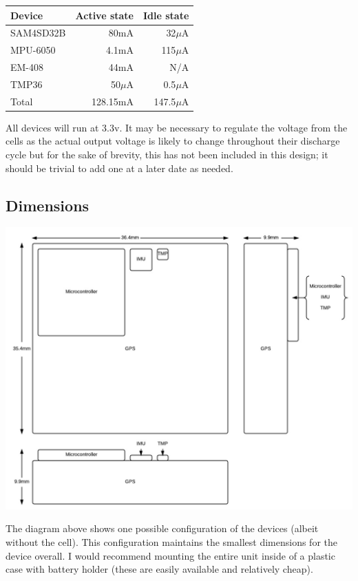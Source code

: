 \documentclass[a4paper, twoside]{article}
\begin{document}
\begin{tabular}{|l|r|r|}
	\hline
	\textbf{Device} & \textbf{Active state} & \textbf{Idle state} \\
	\hline
	\hline
	SAM4SD32B & 80mA & 32$\mu$A \\
	MPU-6050 & 4.1mA & 115$\mu$A \\
	EM-408 & 44mA & N/A \\
	TMP36 & 50$\mu$A & 0.5$\mu$A \\
	\hline
	\hline
	Total & 128.15mA & 147.5$\mu$A \\
	\hline
\end{tabular}
\vspace{20pt}

All devices will run at 3.3v. It may be necessary to regulate the voltage from
the cells as the actual output voltage is likely to change throughout their
discharge cycle but for the sake of brevity, this has not been included in this
design; it should be trivial to add one at a later date as needed.

\clearpage
\subsection{Dimensions}
\begin{center}
\includegraphics[scale=0.25]{images/layout.jpeg}
\end{center}

The diagram above shows one possible configuration of the devices (albeit
without the cell). This configuration maintains the smallest dimensions for the
device overall. I would recommend mounting the entire unit inside of a plastic
case with battery holder (these are easily available and relatively cheap).
\end{document}
